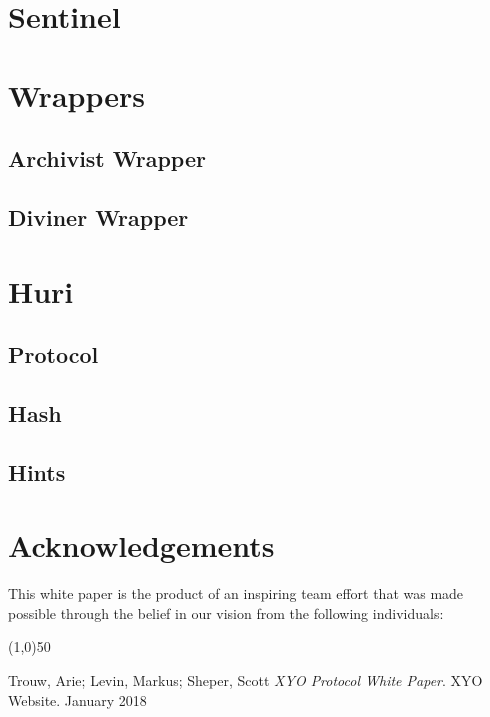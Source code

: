 \documentclass{article}
\begin{document}
\section{Sentinel}
\section{Wrappers}
\subsection{Archivist Wrapper}
\subsection{Diviner Wrapper}
\section{Huri}
\subsection{Protocol}
\subsection{Hash}
\subsection{Hints}

\section {Acknowledgements}
This white paper is the product of an inspiring team effort that was made possible through the belief in our vision from the following individuals: 

\begin{center}
    \line(1,0){50}
\end{center}



\begin{thebibliography}{9}

    Trouw, Arie; Levin, Markus; Sheper, Scott
    \textit{XYO Protocol White Paper}.
    XYO Website. January 2018

\end{thebibliography}

\clearpage

\printglossaries

\end{document}
